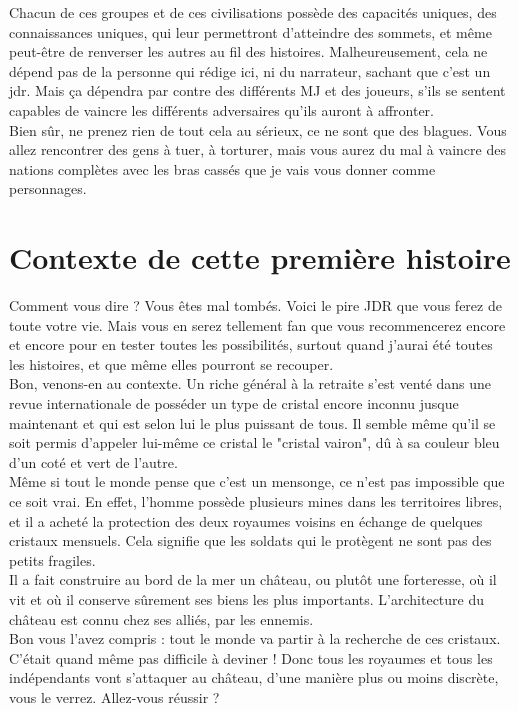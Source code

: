 \documentclass[11pt,a4paper]{book}
\begin{document}
Chacun de ces groupes et de ces civilisations possède des capacités uniques, des connaissances uniques, qui leur permettront d'atteindre des sommets, et même peut-être de renverser les autres au fil des histoires. Malheureusement, cela ne dépend pas de la personne qui rédige ici, ni du narrateur, sachant que c'est un jdr. Mais ça dépendra par contre des différents MJ et des joueurs, s'ils se sentent capables de vaincre les différents adversaires qu'ils auront à affronter. \\
Bien sûr, ne prenez rien de tout cela au sérieux, ce ne sont que des blagues. Vous allez rencontrer des gens à tuer, à torturer, mais vous aurez du mal à vaincre des nations complètes avec les bras cassés que je vais vous donner comme personnages.

\chapter{Contexte de cette première histoire}

Comment vous dire ? Vous êtes mal tombés. Voici le pire JDR que vous ferez de toute votre vie. Mais vous en serez tellement fan que vous recommencerez encore et encore pour en tester toutes les possibilités, surtout quand j'aurai été toutes les histoires, et que même elles pourront se recouper. \\
Bon, venons-en au contexte. Un riche général à la retraite s'est venté dans une revue internationale de posséder un type de cristal encore inconnu jusque maintenant et qui est selon lui le plus puissant de tous. Il semble même qu'il se soit permis d'appeler lui-même ce cristal le "cristal vairon", dû à sa couleur bleu d'un coté et vert de l'autre. \\
Même si tout le monde pense que c'est un mensonge, ce n'est pas impossible que ce soit vrai. En effet, l'homme possède plusieurs mines dans les territoires libres, et il a acheté la protection des deux royaumes voisins en échange de quelques cristaux mensuels. Cela signifie que les soldats qui le protègent ne sont pas des petits fragiles. \\
Il a fait construire au bord de la mer un château, ou plutôt une forteresse, où il vit et où il conserve sûrement ses biens les plus importants. L'architecture du château est connu chez ses alliés, par les ennemis. \\
Bon vous l'avez compris : tout le monde va partir à la recherche de ces cristaux. C'était quand même pas difficile à deviner ! Donc tous les royaumes et tous les indépendants vont s'attaquer au château, d'une manière plus ou moins discrète, vous le verrez. Allez-vous réussir ?
\end{document}
